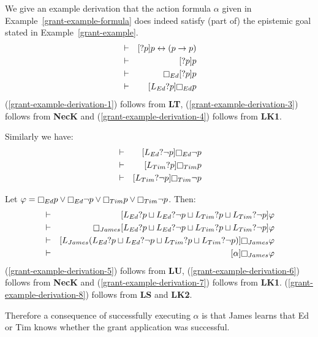 \begin{example}\label{grant-example-derivation}
We give an example derivation that the action formula $\alpha$ given in Example~\ref{grant-example-formula} does indeed satisfy (part of) the epistemic goal stated in Example~\ref{grant-example}.
\begin{eqnarray}
    &\proves& \actionA{\test{\atomP}} \atomP \iff (\atomP \implies \atomP)\label{grant-example-derivation-1}\\
    &\proves& \actionA{\test{\atomP}} \atomP\label{grant-example-derivation-2}\\
    &\proves& \necessary[Ed] \actionA{\test{\atomP}} \atomP\label{grant-example-derivation-3}\\
    &\proves& \actionA{\learns[Ed] \test{\atomP}} \necessary[Ed] \atomP\label{grant-example-derivation-4}
\end{eqnarray}
(\ref{grant-example-derivation-1}) follows from {\bf LT},
(\ref{grant-example-derivation-3}) follows from {\bf NecK} and
(\ref{grant-example-derivation-4}) follows from {\bf LK1}.

Similarly we have:
\begin{eqnarray*}
    &\proves& \actionA{\learns[Ed] \test{\neg \atomP}} \necessary[Ed] \neg \atomP\\
    &\proves& \actionA{\learns[Tim] \test{\atomP}} \necessary[Tim] \atomP\\
    &\proves& \actionA{\learns[Tim] \test{\neg \atomP}} \necessary[Tim] \neg \atomP
\end{eqnarray*}

Let $\phi = \necessary[Ed] \atomP \lor  \necessary[Ed] \neg \atomP \lor \necessary[Tim] \atomP \lor \necessary[Tim] \neg \atomP$. Then:
\begin{eqnarray}
    &\proves& \actionA{\learns[Ed] \test{\atomP} \choice \learns[Ed] \test{\neg \atomP} \choice \learns[Tim] \test{\atomP} \choice \learns[Tim] \test{\neg \atomP}} \phi\label{grant-example-derivation-5}\\
    &\proves& \necessary[James] \actionA{\learns[Ed] \test{\atomP} \choice \learns[Ed] \test{\neg \atomP} \choice \learns[Tim] \test{\atomP} \choice \learns[Tim] \test{\neg \atomP}} \phi\label{grant-example-derivation-6}\\
    &\proves& \actionA{\learns[James] (\learns[Ed] \test{\atomP} \choice \learns[Ed] \test{\neg \atomP} \choice \learns[Tim] \test{\atomP} \choice \learns[Tim] \test{\neg \atomP})} \necessary[James] \phi\label{grant-example-derivation-7}\\
    &\proves& \actionA{\alpha} \necessary[James] \phi\label{grant-example-derivation-8}
\end{eqnarray}
(\ref{grant-example-derivation-5}) follows from {\bf LU},
(\ref{grant-example-derivation-6}) follows from {\bf NecK} and
(\ref{grant-example-derivation-7}) follows from {\bf LK1}.
(\ref{grant-example-derivation-8}) follows from {\bf LS} and {\bf LK2}.

Therefore a consequence of successfully executing $\alpha$ is that James learns that Ed or Tim knows whether the grant application was successful.
\end{example}

